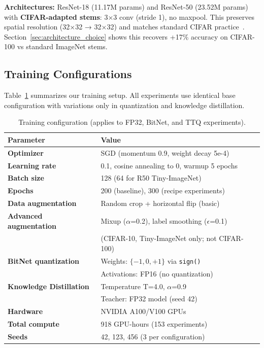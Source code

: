\textbf{Architectures:} ResNet-18 (11.17M params) and ResNet-50 (23.52M params)~\cite{he2016resnet} with \textbf{CIFAR-adapted stems}: 3×3 conv (stride 1), no maxpool. This preserves spatial resolution (32×32 → 32×32) and matches standard CIFAR practice~\cite{pytorch_cifar_kuangliu, pytorch_cifar100_weiaicunzai}. Section~\ref{sec:architecture_choice} shows this recovers +17\% accuracy on CIFAR-100 vs standard ImageNet stems.

\subsection{Training Configurations}

Table~\ref{tab:training_config} summarizes our training setup. All experiments use identical base configuration with variations only in quantization and knowledge distillation.

\begin{table}[h]
\centering
\caption{Training configuration (applies to FP32, BitNet, and TTQ experiments).}
\label{tab:training_config}
\begin{tabular}{ll}
\toprule
\textbf{Parameter} & \textbf{Value} \\
\midrule
\textbf{Optimizer} & SGD (momentum 0.9, weight decay 5e-4) \\
\textbf{Learning rate} & 0.1, cosine annealing to 0, warmup 5 epochs \\
\textbf{Batch size} & 128 (64 for R50 Tiny-ImageNet) \\
\textbf{Epochs} & 200 (baseline), 300 (recipe experiments) \\
\textbf{Data augmentation} & Random crop + horizontal flip (basic) \\
\textbf{Advanced augmentation} & Mixup ($\alpha$=0.2), label smoothing ($\epsilon$=0.1) \\
                               & (CIFAR-10, Tiny-ImageNet only; not CIFAR-100) \\
\textbf{BitNet quantization} & Weights: $\{-1, 0, +1\}$ via \texttt{sign()} \\
                             & Activations: FP16 (no quantization) \\
\textbf{Knowledge Distillation} & Temperature T=4.0, $\alpha$=0.9 \\
                                & Teacher: FP32 model (seed 42) \\
\midrule
\textbf{Hardware} & NVIDIA A100/V100 GPUs \\
\textbf{Total compute} & 918 GPU-hours (153 experiments) \\
\textbf{Seeds} & 42, 123, 456 (3 per configuration) \\
\bottomrule
\end{tabular}
\end{table}

